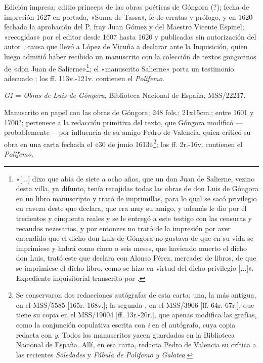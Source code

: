 \documentclass[11pt,a4paper,twoside]{article}
\newcommand{\comillas}[1]{«#1»}
\begin{document}
Edición impresa; editio princeps de las obras poéticas de Góngora (?); fecha de impresión 1627 en portada, «Suma de Tassa», fe de erratas y prólogo, y en 1620 fechada la aprobación del P. fray Juan Gómez y del Maestro Vicente Espinel; «recogidas» por el editor desde 1607 hasta 1620 y publicadas sin autorización del autor \parencite{Alonso1963}, causa que llevó a López de Vicuña a declarar ante la Inquisición, quien luego admitió haber recibido un manuscrito con la colección de textos gongorinos de «don Juan de Salierne»\footnote{\comillas{[...] dixo que abía de siete a ocho años, que un don Juan de Salierne, vezino desta villa, ya difunto, tenía recojidas todas las obras de don Luis de Góngora en un libro manuscripto y trató de imprimillas, para lo qual se sacó privilegio en caveza deste que declara, que era muy su amigo, y además le dio por él trecientos y cinquenta reales y se le entregó a este testigo con las censuras y recaudos nezesarios, y por entonzes no trató de la impresión por aver entendido que el dicho don Luis de Góngora no gustava de que en su vida se imprimiese y habrá como cinco o seis meses, que haviendo muerto el dicho don Luis, trató este que declara con Alonso Pérez, mercader de libros, de que se imprimiese el dicho libro, como se hizo en virtud del dicho privilegio [...]}. Expediente inquisitorial transcrito por \textcite{Moll1997}.}; el \comillas{manuscrito Salierne} porta un testimonio adecuado \parencite{Alonso1963}; los ff. 113v.-121v. contienen el \textit{Polifemo}.\vspace{5pt}

\textit{G1} = \textit{Obras de Luis de Góngora}, Biblioteca Nacional de España, MSS/22217. 

Manuscrito en papel con las obras de Góngora; 248 fols.; 21x15cm.; entre 1601 y 1700?; pertenece a la redacción primitiva del texto, que Góngora modificó —probablemente— por influencia de su amigo Pedro de Valencia, quien criticó su obra en una carta fechada el «30 de junio 1613»\footnote{Se conservaron dos redacciones autógrafas de esta carta; una, la más antigua, en el MSS/5585 [165r.-168v.]; la segunda \parencite{PérezLópez1988}, en el MSS/3906 [ff. 64r.-67r.], que tiene su copia en el MSS/19004 [ff. 13r.-20r.], que apenas modifica las grafías, como la conjunción copulativa escrita con \textit{i} en el autógrafo, cuya copia redacta con \textit{y}. Todos los manuscritos yacen guardados en la Biblioteca Nacional de España. Allí, en esa carta, redacta Pedro de Valencia su crítica a las recientes \textit{Soledades} y \textit{Fábula de Polifemo y Galatea}.}; los ff. 2r.-16v. contienen el \textit{Polifemo}.\vspace{5pt}
\end{document}
